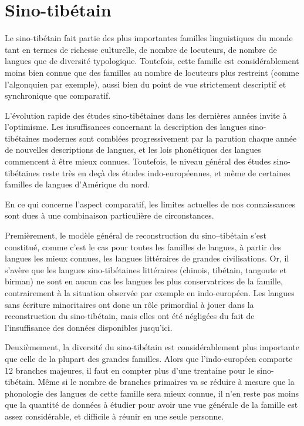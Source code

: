 \documentclass[oldfontcommands,oneside,a4paper,11pt]{memoir}
\begin{document}
\section{Sino-tibétain}
Le  sino-tibétain fait partie des plus importantes familles linguistiques du monde tant   en termes de richesse culturelle, de nombre de locuteurs, de nombre de langues que de diversité typologique. Toutefois, cette famille est considérablement moins bien connue que des familles au nombre de locuteurs plus restreint (comme l'algonquien par exemple), aussi bien du point de vue strictement descriptif et synchronique  que comparatif.

L'évolution rapide des études sino-tibétaines dans les dernières années invite à l'optimisme. Les insuffisances concernant la description des langues sino-tibétaines modernes sont comblées progressivement par la parution chaque année de nouvelles descriptions de langues, et les lois phonétiques des langues commencent à être mieux connues. Toutefois, le niveau général des études sino-tibétaines reste très en deçà des études indo-européennes, et même de certaines familles de langues d'Amérique du nord.

En ce qui concerne l'aspect comparatif, les limites actuelles de nos connaissances sont dues à une combinaison particulière de circonstances. 

Premièrement, le modèle général de reconstruction du sino--tibétain s'est constitué, comme c'est le cas pour toutes les familles de langues, à partir des langues les mieux connues, les langues littéraires de grandes civilisations. Or, il s'avère  que les langues sino-tibétaines littéraires (chinois, tibétain, tangoute et birman) ne sont en aucun cas les langues les plus conservatrices de la famille, contrairement à la situation observée par exemple en indo-européen. Les langues sans écriture  minoritaires ont donc un rôle primordial à jouer dans la reconstruction du sino-tibétain, mais elles ont été négligées du fait de l'insuffisance des données disponibles jusqu'ici.

Deuxièmement, la diversité du sino-tibétain est considérablement plus importante que celle de la plupart des grandes familles. Alors que l'indo-européen comporte 12 branches majeures, il faut en compter plus d'une trentaine pour le sino-tibétain. Même si le nombre de branches primaires va se réduire à mesure que la phonologie des langues de cette famille sera mieux connue, il n'en reste pas moins que la quantité de données à étudier pour avoir une vue générale de la famille est assez considérable, et difficile à réunir en une seule personne.
\end{document}
